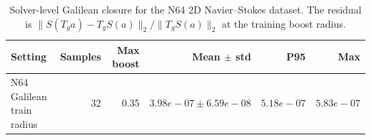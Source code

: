 \begin{table}[t]
\centering
\small
\caption{Solver-level Galilean closure for the N64 2D Navier--Stokes dataset. The residual is $\|S(T_g a)-T_gS(a)\|_2/\|T_gS(a)\|_2$ at the training boost radius.}
\label{tab:n64-solver-closure}
\begin{tabular}{lrrrrr}
\toprule
Setting & Samples & Max boost & Mean $\pm$ std & P95 & Max \\
\midrule
N64 Galilean train radius & 32 & 0.35 & \(3.98e-07\pm6.59e-08\) & \(5.18e-07\) & \(5.83e-07\) \\
\bottomrule
\end{tabular}
\end{table}
